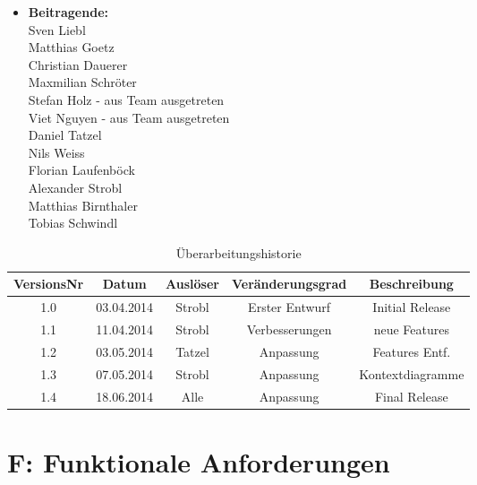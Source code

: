\documentclass[10pt,a4paper]{scrartcl}
\begin{document}
\newcommand{\Version}{1.2}






\newpage
\begin{itemize}
\item[] \textbf{\large Beitragende:}\\
Sven Liebl\\
Matthias Goetz\\
Christian Dauerer\\
Maxmilian Schröter\\
Stefan Holz - aus Team ausgetreten\\
Viet Nguyen - aus Team ausgetreten \\
Daniel Tatzel\\
Nils Weiss\\
Florian Laufenböck\\
Alexander Strobl\\
Matthias Birnthaler\\
Tobias Schwindl
\end{itemize}

\bigskip

\begin{table}[!h]
 	\centering
	\begin{tabular}{|c|c|c|c||c|}
	\hline
	\textbf{VersionsNr} &  \textbf{Datum} & \textbf{Auslöser} & \textbf{Veränderungsgrad} & \textbf{Beschreibung} \\
	\hline
	1.0 & 03.04.2014 & Strobl & Erster Entwurf & Initial Release \\
	\hline
	1.1 & 11.04.2014 & Strobl & Verbesserungen & neue Features \\
	\hline
	1.2 & 03.05.2014 & Tatzel & Anpassung & Features Entf. \\
	\hline
	1.3 & 07.05.2014 & Strobl & Anpassung & Kontextdiagramme \\
	\hline
	1.4 & 18.06.2014 & Alle & Anpassung & Final Release \\
	\hline
	\end{tabular}

\caption{Überarbeitungshistorie}
\end{table}

\newpage
\tableofcontents


\newpage
\section{F: Funktionale Anforderungen}
\end{document}
